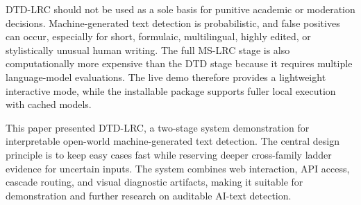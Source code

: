 \documentclass[11pt]{article}
\begin{document}
DTD-LRC should not be used as a sole basis for punitive academic or moderation decisions. Machine-generated text detection is probabilistic, and false positives can occur, especially for short, formulaic, multilingual, highly edited, or stylistically unusual human writing. The full MS-LRC stage is also computationally more expensive than the DTD stage because it requires multiple language-model evaluations. The live demo therefore provides a lightweight interactive mode, while the installable package supports fuller local execution with cached models.

This paper presented DTD-LRC, a two-stage system demonstration for interpretable open-world machine-generated text detection. The central design principle is to keep easy cases fast while reserving deeper cross-family ladder evidence for uncertain inputs. The system combines web interaction, API access, cascade routing, and visual diagnostic artifacts, making it suitable for demonstration and further research on auditable AI-text detection.




\end{document}
